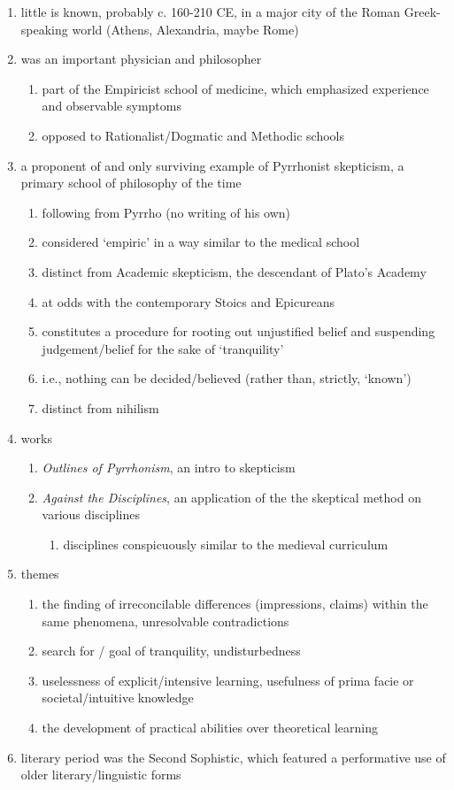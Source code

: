 \documentclass[12pt]{article}
\begin{document}
\begin{enumerate}
\item little is known, probably c. 160-210 CE, in a major city of the Roman Greek-speaking world (Athens, Alexandria, maybe Rome)
\item was an important physician and philosopher
    \begin{enumerate}
    \item part of the Empiricist school of medicine, which emphasized experience and observable symptoms
    \item opposed to Rationalist/Dogmatic and Methodic schools
    \end{enumerate}
\item a proponent of and only surviving example of Pyrrhonist skepticism, a primary school of philosophy of the time
    \begin{enumerate}
    \item following from Pyrrho (no writing of his own)
    \item considered `empiric' in a way similar to the medical school
    \item distinct from Academic skepticism, the descendant of Plato's Academy
    \item at odds with the contemporary Stoics and Epicureans
    \item constitutes a procedure for rooting out unjustified belief and suspending judgement/belief for the sake of `tranquility'
    \item i.e., nothing can be decided/believed (rather than, strictly, `known')
    \item distinct from nihilism
    \end{enumerate}
\item works
    \begin{enumerate}
    \item \textit{Outlines of Pyrrhonism}, an intro to skepticism
    \item \textit{Against the Disciplines}, an application of the the skeptical method on various disciplines
        \begin{enumerate}
        \item disciplines conspicuously similar to the medieval curriculum
        \end{enumerate}
    \end{enumerate}
\item themes
    \begin{enumerate}
    \item the finding of irreconcilable differences (impressions, claims) within the same phenomena, unresolvable contradictions
    \item search for / goal of tranquility, undisturbedness
    \item uselessness of explicit/intensive learning, usefulness of prima facie or societal/intuitive knowledge
    \item the development of practical abilities over theoretical learning
    \end{enumerate}
\item literary period was the Second Sophistic, which featured a performative use of older literary/linguistic forms
\end{enumerate}
\end{document}
